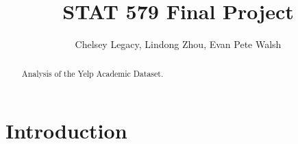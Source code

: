 \documentclass[12pt]{article}
\begin{document}
\author{Chelsey Legacy, Lindong Zhou, Evan Pete Walsh}
\title{STAT 579 Final Project}
\maketitle

\begin{abstract}
Analysis of the Yelp Academic Dataset.
\end{abstract}

\newpage

\tableofcontents

\newpage

\pagestyle{fancy}
\rhead{\thepage}
\rfoot{\today}
\cfoot{}%


\section{Introduction}
\end{document}
